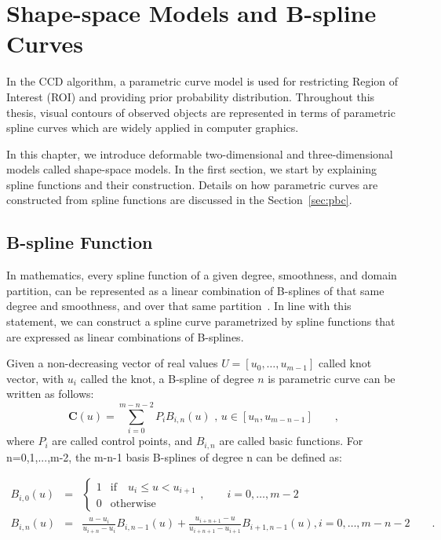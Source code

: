 \chapter{Shape-space Models and B-spline Curves}
\label{chapter:bspline}
In the CCD algorithm, a parametric curve model is used for
restricting Region of Interest (ROI) and providing prior probability distribution. 
Throughout this thesis, visual contours of observed objects are represented in terms of
parametric spline curves which are widely applied in computer graphics.

In this chapter, we introduce deformable two-dimensional and three-dimensional models called
shape-space models.  In the first section, we start by explaining
spline functions and their construction. Details on how parametric
curves are constructed from spline functions are discussed in the
Section~\ref{sec:pbc}. %
\section{B-spline Function}
\label{sec:bsc}
In mathematics, every spline function of a given degree,
smoothness, and domain partition, can be represented as a linear
combination of B-splines of that same degree and smoothness, and over
that same partition~\cite{press2007numerical}. In line with this statement, we can
construct  a spline curve parametrized by spline functions that are
expressed as linear combinations of B-splines. 

Given a non-decreasing vector of real values $U = [u_0, \ldots,
u_{m-1}]$ called knot vector, with $u_i$ called the knot, a
B-spline of degree $n$ is parametric curve can be written as follows:
\begin{equation}
  \label{eq:4.1}
  \mathbf{C}(u) =  \sum_{i=0}^{m-n-2} P_{i} B_{i,n}(u) \mbox{ , } u \in [u_{n},u_{m-n-1}]\qquad,
\end{equation}
where $P_i$ are called control points, and $B_{i,n}$ are called
basic functions. For n=0,1,...,m-2, the m-n-1 basis B-splines of degree
n can be defined as:

\begin{eqnarray}
  \label{eq:4.2}
  B_{i,0}(u) &=&  \left\{
\begin{matrix} 
1 & \mathrm{if} \quad u_i \leq u < u_{i+1} \\
0 & \mathrm{otherwise}
\end{matrix}
\right.,\qquad i=0,\ldots, m{-}2 \\
B_{i,n}(u) &=& \frac{u - u_i}{u_{i+n} - u_i} B_{i,n-1}(u) + \frac{u_{i+n+1} - u}{u_{i+n+1} - u_{i+1}} B_{i+1,n-1}(u)
, i=0,\ldots, m{-}n{-}2 \qquad.
\end{eqnarray}

